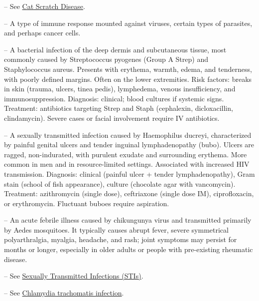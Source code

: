 -- See \hyperlink{Cat Scratch Disease}{Cat Scratch Disease}.

-- A type of immune response mounted against viruses, certain types of parasites, and perhaps cancer cells.

-- A bacterial infection of the deep dermis and subcutaneous tissue, most commonly caused by Streptococcus pyogenes (Group A Strep) and Staphylococcus aureus. Presents with erythema, warmth, edema, and tenderness, with poorly defined margins. Often on the lower extremities. Risk factors: breaks in skin (trauma, ulcers, tinea pedis), lymphedema, venous insufficiency, and immunosuppression. Diagnosis: clinical; blood cultures if systemic signs. Treatment: antibiotics targeting Strep and Staph (cephalexin, dicloxacillin, clindamycin). Severe cases or facial involvement require IV antibiotics.

-- A sexually transmitted infection caused by Haemophilus ducreyi, characterized by painful genital ulcers and tender inguinal lymphadenopathy (bubo). Ulcers are ragged, non-indurated, with purulent exudate and surrounding erythema. More common in men and in resource-limited settings. Associated with increased HIV transmission. Diagnosis: clinical (painful ulcer + tender lymphadenopathy), Gram stain (school of fish appearance), culture (chocolate agar with vancomycin). Treatment: azithromycin (single dose), ceftriaxone (single dose IM), ciprofloxacin, or erythromycin. Fluctuant buboes require aspiration.

-- An acute febrile illness caused by chikungunya virus and transmitted primarily by Aedes mosquitoes. It typically causes abrupt fever, severe symmetrical polyarthralgia, myalgia, headache, and rash; joint symptoms may persist for months or longer, especially in older adults or people with pre-existing rheumatic disease.

-- See \hyperlink{Sexually Transmitted Infections (STIs)}{Sexually Transmitted Infections (STIs)}.

-- See \hyperlink{Chlamydia trachomatis infection}{Chlamydia trachomatis infection}.

